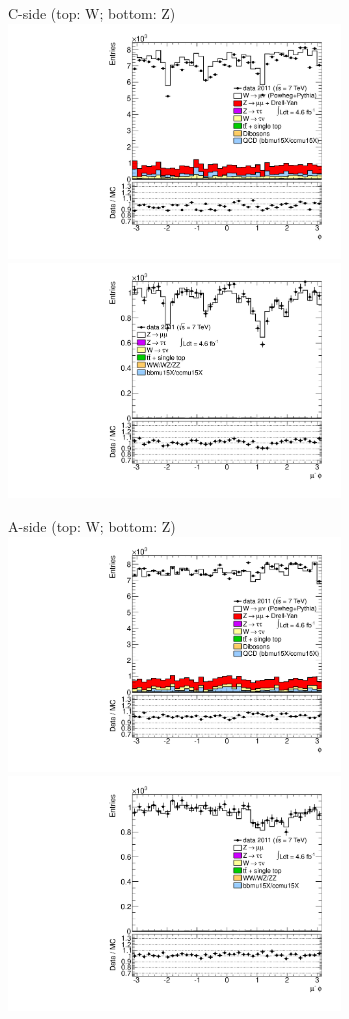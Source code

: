 {

\colb[T]

C-side (top: W; bottom: Z)
\centering
\includegraphics[width=0.66\textwidth]{dates/20130306/figures/etaphi/W_10_C_stack_l_phi_NEG} \\
\includegraphics[width=0.66\textwidth]{dates/20130306/figures/etaphi/Z_10_C_stack_lN_phi_ALL.pdf}

A-side (top: W; bottom: Z)
\centering
\includegraphics[width=0.66\textwidth]{dates/20130306/figures/etaphi/W_10_A_stack_l_phi_NEG} \\
\includegraphics[width=0.66\textwidth]{dates/20130306/figures/etaphi/Z_10_A_stack_lN_phi_ALL.pdf} 

\cole
}


